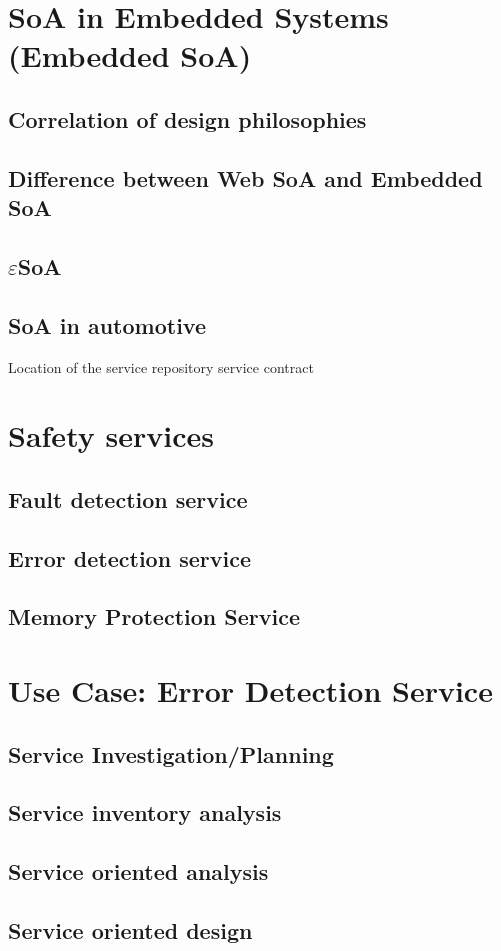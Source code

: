 \section{SoA in Embedded Systems (Embedded SoA)}
\subsection{Correlation of design philosophies}
\subsection{Difference between Web SoA and Embedded SoA}
\subsection{$\varepsilon$SoA}
\subsection{SoA in automotive}
Location of the service repository
service contract

\section{Safety services}
\subsection{Fault detection service}
\subsection{Error detection service}
\subsection{Memory Protection Service}

\section{Use Case: Error Detection Service}
\subsection{Service Investigation/Planning}
\subsection{Service inventory analysis}
\subsection{Service oriented analysis}
\subsection{Service oriented design}
